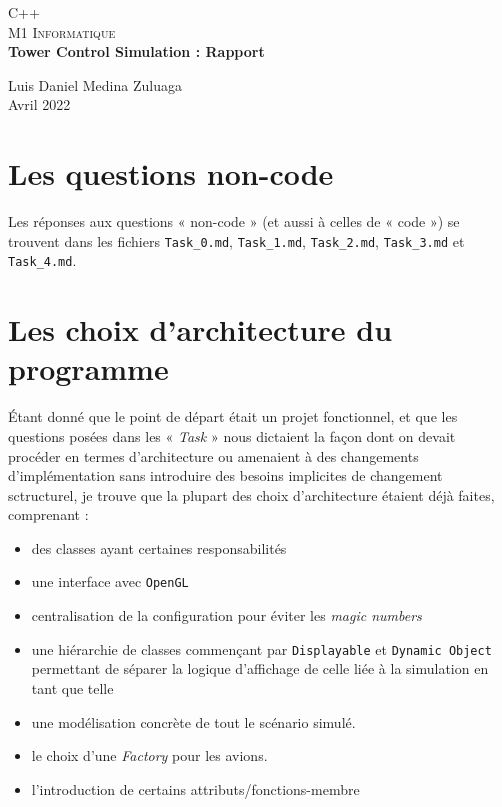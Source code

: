 \documentclass{article}
\begin{document}
\begin{center}
  \textsc{\LARGE C++} \\[0.5cm]
  \textsc{\large M1 Informatique} \\[2cm]


  { \large \bfseries Tower Control Simulation : Rapport }

  \vfill

  \large Luis Daniel Medina Zuluaga\\[0.5cm]
  \large Avril 2022
\end{center}

\pagebreak


\section{Les questions non-code}

Les réponses aux questions « non-code » (et aussi à celles de « code ») se trouvent dans les fichiers \texttt{Task\_0.md}, \texttt{Task\_1.md}, \texttt{Task\_2.md}, \texttt{Task\_3.md} et \texttt{Task\_4.md}.

\section{Les choix d'architecture du programme}

Étant donné que le point de départ était un projet fonctionnel, et que les questions posées dans les « \textit{Task} » nous dictaient la façon dont on devait procéder en termes d'architecture ou amenaient à des changements d'implémentation sans introduire des besoins implicites de changement sctructurel, je trouve que la plupart des choix d'architecture étaient déjà faites, comprenant :

\begin{itemize}[noitemsep]
\item des classes ayant certaines responsabilités
\item une interface avec \texttt{OpenGL}
\item centralisation de la configuration pour éviter les \textit{magic numbers}
\item une hiérarchie de classes commençant par \texttt{Displayable} et \texttt{Dynamic Object} permettant de séparer la logique d'affichage de celle liée à la simulation en tant que telle
\item une modélisation concrète de tout le scénario simulé.
\item le choix d'une \textit{Factory} pour les avions.
\item l'introduction de certains attributs/fonctions-membre
\end{itemize}
\end{document}
